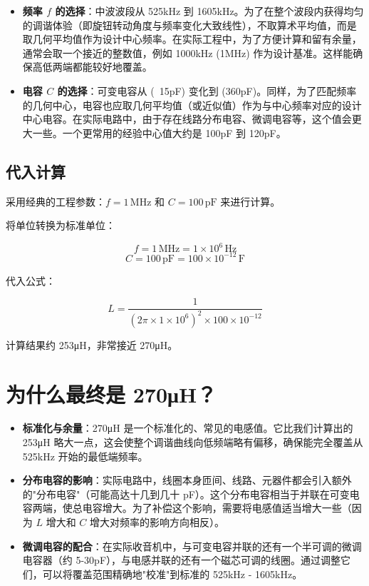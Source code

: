\documentclass[12pt,UTF8]{ctexbook}
\begin{document}
\begin{itemize}[leftmargin=2cm]
	\item \textbf{频率 \( f \) 的选择}：中波波段从 525kHz 到 1605kHz。为了在整个波段内获得均匀的调谐体验（即旋钮转动角度与频率变化大致线性），不取算术平均值，而是取几何平均值作为设计中心频率。在实际工程中，为了方便计算和留有余量，通常会取一个接近的整数值，例如 1000kHz (1MHz) 作为设计基准。这样能确保高低两端都能较好地覆盖。
	\item \textbf{电容 \( C \) 的选择}：可变电容从 (~15pF) 变化到 (360pF)。同样，为了匹配频率的几何中心，电容也应取几何平均值（或近似值）作为与中心频率对应的设计中心电容。在实际电路中，由于存在线路分布电容、微调电容等，这个值会更大一些。一个更常用的经验中心值大约是 100pF 到 120pF。
\end{itemize}

\subsection{代入计算}

采用经典的工程参数：\( f = 1 \, \text{MHz} \) 和 \( C = 100 \, \text{pF} \) 来进行计算。

将单位转换为标准单位：

\[ f = 1 \, \text{MHz} = 1 \times 10^6 \, \text{Hz} \]
\[ C = 100 \, \text{pF} = 100 \times 10^{-12} \, \text{F} \]

代入公式：

\[ L = \frac{1}{(2\pi \times 1 \times 10^6)^2 \times 100 \times 10^{-12}} \]

计算结果约 253μH，非常接近 270μH。

\section{为什么最终是 270μH？}

\begin{itemize}[leftmargin=2cm]
	\item \textbf{标准化与余量}：270μH 是一个标准化的、常见的电感值。它比我们计算出的 253μH 略大一点，这会使整个调谐曲线向低频端略有偏移，确保能完全覆盖从 525kHz 开始的最低端频率。
	\item \textbf{分布电容的影响}：实际电路中，线圈本身匝间、线路、元器件都会引入额外的"分布电容"（可能高达十几到几十 pF）。这个分布电容相当于并联在可变电容两端，使总电容增大。为了补偿这个影响，需要将电感值适当增大一些（因为 \( L \) 增大和 \( C \) 增大对频率的影响方向相反）。
	\item \textbf{微调电容的配合}：在实际收音机中，与可变电容并联的还有一个半可调的微调电容器（约 5-30pF），与电感并联的还有一个磁芯可调的线圈。通过调整它们，可以将覆盖范围精确地"校准"到标准的 525kHz - 1605kHz。
\end{itemize}
\end{document}
